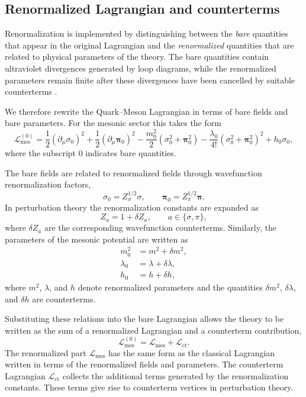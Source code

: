 \subsection*{Renormalized Lagrangian and counterterms}

Renormalization is implemented by distinguishing between the
\emph{bare} quantities that appear in the original Lagrangian and the
\emph{renormalized} quantities that are related to physical
parameters of the theory. The bare quantities contain ultraviolet
divergences generated by loop diagrams, while the renormalized
parameters remain finite after these divergences have been cancelled
by suitable counterterms \cite{PeskinSchroeder1995,WeinbergQFT}.

We therefore rewrite the Quark--Meson Lagrangian in terms of bare
fields and bare parameters. For the mesonic sector this takes the
form
\begin{equation}
\mathcal{L}_{\mathrm{mes}}^{(0)}
=
\frac{1}{2}(\partial_\mu \sigma_0)^2
+
\frac{1}{2}(\partial_\mu \boldsymbol{\pi}_0)^2
-
\frac{m_0^2}{2}(\sigma_0^2+\boldsymbol{\pi}_0^2)
-
\frac{\lambda_0}{4!}(\sigma_0^2+\boldsymbol{\pi}_0^2)^2
+
h_0 \sigma_0 ,
\end{equation}
where the subscript $0$ indicates bare quantities.

The bare fields are related to renormalized fields through
wavefunction renormalization factors,
\begin{equation}
\sigma_0 = Z_\sigma^{1/2}\sigma,
\qquad
\boldsymbol{\pi}_0 = Z_\pi^{1/2}\boldsymbol{\pi}.
\end{equation}
In perturbation theory the renormalization constants are expanded as
\begin{equation}
Z_a = 1 + \delta Z_a,
\qquad
a \in \{\sigma,\pi\},
\end{equation}
where $\delta Z_a$ are the corresponding wavefunction counterterms.
Similarly, the parameters of the mesonic potential are written as
\begin{align}
m_0^2 &= m^2 + \delta m^2, \\
\lambda_0 &= \lambda + \delta \lambda, \\
h_0 &= h + \delta h ,
\end{align}
where $m^2$, $\lambda$, and $h$ denote renormalized parameters and the
quantities $\delta m^2$, $\delta\lambda$, and $\delta h$ are
counterterms.

Substituting these relations into the bare Lagrangian allows the
theory to be written as the sum of a renormalized Lagrangian and a
counterterm contribution,
\begin{equation}
\mathcal{L}_{\mathrm{mes}}^{(0)}
=
\mathcal{L}_{\mathrm{mes}}
+
\mathcal{L}_{\mathrm{ct}} .
\end{equation}
The renormalized part $\mathcal{L}_{\mathrm{mes}}$ has the same form
as the classical Lagrangian written in terms of the renormalized
fields and parameters. The counterterm Lagrangian
$\mathcal{L}_{\mathrm{ct}}$ collects the additional terms generated by
the renormalization constants. These terms give rise to
counterterm vertices in perturbation theory.

